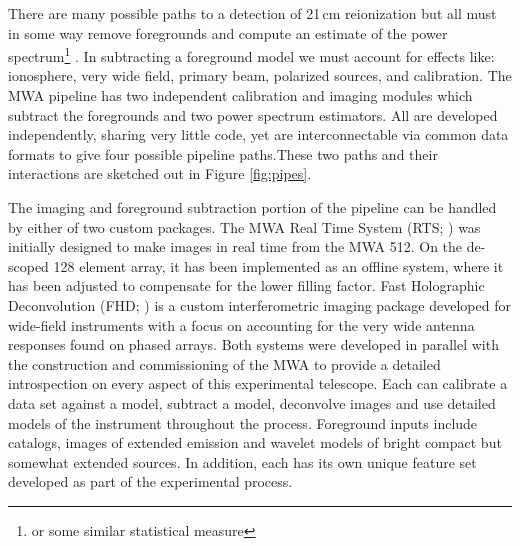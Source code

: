 \documentclass[preprint2]{aastex}
\begin{document}
  There are many possible paths to a detection of 21\,cm reionization but all must in some way remove foregrounds and compute an estimate of the power spectrum\footnote{or some similar statistical measure} . In subtracting a foreground model we must account for effects like: ionosphere, very wide field, primary beam, polarized sources, and calibration. The MWA pipeline has two independent calibration and imaging modules which subtract the foregrounds and two power spectrum estimators. All are developed independently, sharing very little code, yet are interconnectable via common data formats to give four possible pipeline paths.These two paths and their interactions are sketched out in Figure \ref{fig:pipes}.


The imaging and foreground subtraction portion of the pipeline can be handled by either of two custom packages.  The MWA Real Time System (RTS; \cite{Ord:2010p8442}) was initially designed to make images in real time from the MWA 512.  On the de-scoped 128 element array, it has been implemented as an offline system, where it has been adjusted to compensate for the lower filling factor.  Fast Holographic Deconvolution (FHD; \cite{Sullivan:2012p9457}) is a custom interferometric imaging package developed for wide-field instruments with a focus on accounting for the very wide antenna responses found on phased arrays.  Both systems were developed in parallel with the construction and commissioning of the MWA to provide a detailed introspection on every aspect of this experimental telescope. Each can calibrate a data set against a model, subtract a model, deconvolve images and use detailed models of the instrument throughout the process.  Foreground inputs include catalogs, images of extended emission and wavelet models of bright compact but somewhat extended sources.  In addition, each has its own unique feature set developed as part of the experimental process.
\end{document}
